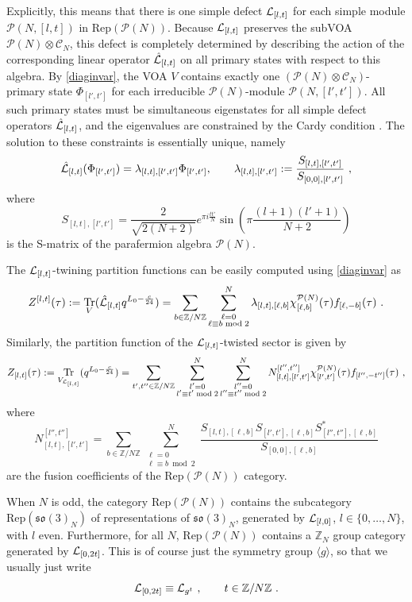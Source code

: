 \documentclass[11pt,reqno]{article}
\newcommand{\be}{\begin{equation}}
\newcommand{\ee}{\end{equation}}
\newcommand{\CL}{{\cal L}}
\newcommand{\calC}{\mathcal{C}}
\DeclareMathOperator{\Tr}{Tr}
\newcommand{\ZZ}{\mathbb{Z}}
\newcommand{\paraf}{\mathcal{P}}
\newcommand{\alg}[1]{\mathfrak{#1}}
\begin{document}
Explicitly, this means that there is one simple defect $\CL_{[l,t]}$ for each simple module $\paraf(N,[l,t])$ in $\mathrm{Rep}(\paraf(N))$. Because $\CL_{[l,t]}$  preserves the subVOA $\paraf(N)\otimes \calC_N$, this defect is completely determined by describing the action of the corresponding linear operator $\hat\CL_{[l,t]}$ on all primary states with respect to this algebra.  By \eqref{diaginvar}, the VOA $V$ contains exactly one $(\paraf(N)\otimes \calC_N)$-primary state $\Phi_{[l',t']}$ for each irreducible $\paraf(N)$-module $\paraf(N,[l',t'])$. All such primary states must be simultaneous eigenstates for all simple defect operators $\hat\CL_{[l,t]}$, and the eigenvalues are constrained by the Cardy condition \cite{Petkova:2000ip,Chang_2019}. The solution to these constraints is essentially unique, namely
\be \hat \CL_{[l,t]}(\Phi_{[l',t']}) =\lambda_{[l,t],[l',t']}\Phi_{[l',t']},\qquad \lambda_{[l,t],[l',t']}:= \frac{S_{[l,t],[l',t']}}{S_{[0,0],[l',t']}}\ ,
\ee where \be S_{[l,t],[l',t']}=\frac{2}{\sqrt{2(N+2)}}e^{\pi i \frac{tt'}{N}}\sin\left(\pi \frac{(l+1)(l'+1)}{N+2}\right) \ee
is the S-matrix of the parafermion algebra $\paraf(N)$. 

The $\CL_{[l,t]}$-twining partition functions can be easily computed using \eqref{diaginvar} as
\be Z^{[l,t]}(\tau):=\Tr_V(\hat\CL_{[l,t]}q^{L_0-\frac{c}{24}})=\sum_{b\in \ZZ/N\ZZ} \sum_{\substack{\ell=0\\\ell\equiv b\bmod{2}}}^N \lambda_{[l,t],[\ell ,b]}\chi^{\paraf(N)}_{[\ell ,b]}(\tau)f_{[\ell,-b]}(\tau)\ .
\ee Similarly, the partition function of the $\CL_{[l,t]}$-twisted sector is given by
\be Z_{[l,t]}(\tau):=\Tr_{V_{\CL_{[l,t]}}}(q^{L_0-\frac{c}{24}})=\sum_{t',t''\in \ZZ/N\ZZ} \sum_{\substack{l'=0\\l'\equiv t'\bmod{2}}}^N \sum_{\substack{l''=0\\l''\equiv t''\bmod{2}}}^N N_{[l,t],[l',t']}^{[l'',t'']}\chi^{\paraf(N)}_{[l',t']}(\tau)f_{[l'',-t'']}(\tau)\ ,
\ee where
\be N_{[l,t],[l',t']}^{[l'',t'']}=\sum_{b\in \ZZ/N\ZZ}\sum_{\substack{\ell=0\\\ell\equiv b\bmod{2}}}^N\frac{S_{[l,t],[\ell,b]}S_{[l',t'],[\ell,b]}S^*_{[l'',t''],[\ell,b]}}{S_{[0,0],[\ell,b]}}
\ee are the fusion coefficients of the $\mathrm{Rep}(\paraf(N))$ category.

When $N$ is odd, the category $\mathrm{Rep}(\paraf(N))$ 
contains  the subcategory $ \mathrm{Rep}(\alg{so}(3)_N)$ of representations of $\alg{so}(3)_N$, generated by $\CL_{[l,0]}$, $l\in \{0,\ldots, N\}$, with $l$ even. Furthermore, for all $N$, $\mathrm{Rep}(\paraf(N))$ contains a $\ZZ_N$ group category generated by $\CL_{[0,2t]}$. This is of course just the symmetry group $\langle g\rangle$, so that we usually just write
\be \CL_{[0,2t]}\equiv \CL_{g^t}\ ,\qquad t\in \ZZ/N\ZZ\ .
\ee
\end{document}
